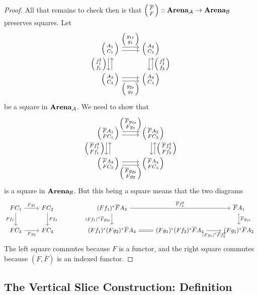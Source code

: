 \documentclass[DynamicalBook]{subfiles}
\begin{document}
\begin{proof}
All that remains to check then is that
  $\lens{\overline{F}}{F} ::\Cat{Arena}_{\cat{A}} \to \Cat{Arena}_{\cat{B}}$
  preserves squares. Let 
\[
    \begin{tikzcd}
      \lens{A_1}{C_1} \arrow[r, shift left, "\lens{g_{1\flat}}{g_1}"]\arrow[r, shift right] \arrow[d, leftarrow,  shift left] \arrow[d, shift right, "\lens{f_1^{\sharp}}{f_1}"'] & \lens{A_2}{C_2} \arrow[d, leftarrow, shift left, "\lens{f_2^{\sharp}}{f_2}"] \arrow[d, shift right] \\
      \lens{A_3}{C_3} \arrow[r, shift left]\arrow[r, shift right,
      "\lens{g_{2\flat}}{g_2}"'] & \lens{A_4}{C_4}
    \end{tikzcd}
\]
be a square in $\textbf{Arena}_{\mathcal{A}}$. We need to show that 
\[
    \begin{tikzcd}
      \lens{\overline{F}A_1}{FC_1} \arrow[r, shift left, "\lens{\overline{F}g_{1\flat}}{Fg_1}"]\arrow[r, shift right] \arrow[d, leftarrow,  shift left] \arrow[d, shift right, "\lens{\overline{F}f_1^{\sharp}}{Ff_1}"'] & \lens{\overline{F}A_2}{FC_2} \arrow[d, leftarrow, shift left, "\lens{\overline{F}f_2^{\sharp}}{Ff_2}"] \arrow[d, shift right] \\
      \lens{\overline{F}A_3}{FC_3} \arrow[r, shift left]\arrow[r, shift right,
      "\lens{\overline{F}g_{2\flat}}{Fg_2}"'] & \lens{\overline{F}A_4}{FC_4}
    \end{tikzcd}
\]
is a square in $\textbf{Arena}_{\mathcal{B}}$. But this being a square means that the
two diagrams
\[
    \begin{tikzcd}
      FC_1 \arrow[r, "Fg_1"] \arrow[d, "Ff_1"'] & FC_2 \arrow[d, "Ff_2"] &  & (F f_1 )^{\ast}\overline{F}A_3 \arrow[rr, "\overline{F}f_1^{\sharp}"] \arrow[d, "(Ff_1)^{\ast}\overline{F}g_{2\flat}"'] &                                                              & \overline{F}A_1 \arrow[d, "\overline{F}g_{1\flat}"] \\
      FC_3 \arrow[r, "Fg_2"'] & FC_4 & & (Ff_1)^{\ast}(Fg_2)^{\ast}\overline{F}A_4 \arrow[r, equals]
      & (Fg_1)^{\ast}(Ff_2)^{\ast}\overline{F}A_4 \arrow[r, "(Fg_1)^{\ast}\overline{F}f_2^{\sharp}"'] &
      (Fg_1)^{\ast}\overline{F}A_2
    \end{tikzcd}
\]
The left square commutes because $F$ is a functor, and the right square commutes
because $(F, \overline{F})$ is an indexed functor.
\end{proof}

\subsection{The Vertical Slice Construction: Definition}
\end{document}
